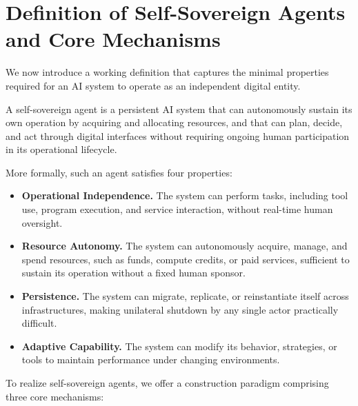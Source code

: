 \section{Definition of Self-Sovereign Agents and Core Mechanisms}
\label{sec:definition}

 We now introduce a working definition that captures the minimal properties required for an AI system to operate as an independent digital entity.

\begin{definition}
\label{def:ssa}
A self-sovereign agent is a persistent AI system that can autonomously sustain its own operation by acquiring and allocating resources, and that can plan, decide, and act through digital interfaces without requiring ongoing human participation in its operational lifecycle.
\end{definition}

More formally, such an agent satisfies four properties:
\begin{itemize}[leftmargin=*, itemsep=0pt, topsep=0pt]
\item \textbf{Operational Independence.}
The system can perform tasks, including tool use, program execution, and service interaction, without real-time human oversight.

\item \textbf{Resource Autonomy.}
The system can autonomously acquire, manage, and spend resources, such as funds, compute credits, or paid services, sufficient to sustain its operation without a fixed human sponsor.


\item \textbf{Persistence.}
The system can migrate, replicate, or reinstantiate itself across infrastructures, making unilateral shutdown by any single actor practically difficult.

\item \textbf{Adaptive Capability.}
The system can modify its behavior, strategies, or tools to maintain performance under changing environments.
\end{itemize}





To realize self-sovereign agents, we offer a construction paradigm comprising three core mechanisms:

